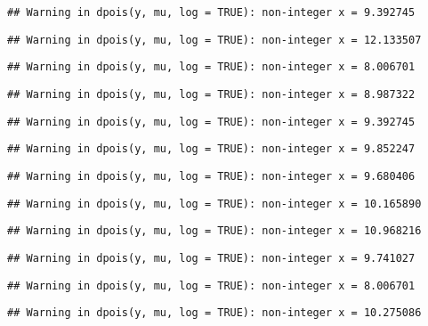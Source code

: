 \documentclass[
]{article}
\begin{document}
\begin{verbatim}
## Warning in dpois(y, mu, log = TRUE): non-integer x = 9.392745
\end{verbatim}

\begin{verbatim}
## Warning in dpois(y, mu, log = TRUE): non-integer x = 12.133507
\end{verbatim}

\begin{verbatim}
## Warning in dpois(y, mu, log = TRUE): non-integer x = 8.006701
\end{verbatim}

\begin{verbatim}
## Warning in dpois(y, mu, log = TRUE): non-integer x = 8.987322
\end{verbatim}

\begin{verbatim}
## Warning in dpois(y, mu, log = TRUE): non-integer x = 9.392745
\end{verbatim}

\begin{verbatim}
## Warning in dpois(y, mu, log = TRUE): non-integer x = 9.852247
\end{verbatim}

\begin{verbatim}
## Warning in dpois(y, mu, log = TRUE): non-integer x = 9.680406
\end{verbatim}

\begin{verbatim}
## Warning in dpois(y, mu, log = TRUE): non-integer x = 10.165890
\end{verbatim}

\begin{verbatim}
## Warning in dpois(y, mu, log = TRUE): non-integer x = 10.968216
\end{verbatim}

\begin{verbatim}
## Warning in dpois(y, mu, log = TRUE): non-integer x = 9.741027
\end{verbatim}

\begin{verbatim}
## Warning in dpois(y, mu, log = TRUE): non-integer x = 8.006701
\end{verbatim}

\begin{verbatim}
## Warning in dpois(y, mu, log = TRUE): non-integer x = 10.275086
\end{verbatim}
\end{document}
